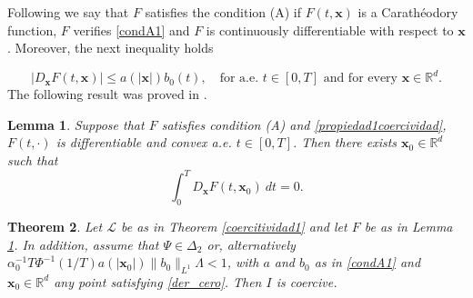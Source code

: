 \documentclass[twoside]{article}
\newtheorem{thm}{Theorem}[section]
\newtheorem{lem}[thm]{Lemma}
\theoremstyle{remark}
\renewcommand{\b}[1]{\boldsymbol{#1}}
\newcommand{\rr}{\mathbb{R}}
\renewcommand{\leq}{\leqslant}
\begin{document}
Following \cite{mawhin2010critical} we say that $F$ satisfies the condition (A) if  $F(t,\b{x})$ is a Carath\'eodory function, $F$ verifies \eqref{condA1} and $F$ is continuously differentiable with respect to $\b{x}$. Moreover, the next inequality holds 

\begin{equation}\label{condA2} |D_{\b{x}}F(t,\b{x})|\leq a(|\b{x}|)b_0(t),\quad\text{for a.e. }t\in [0,T] \text{ and for every }\b{x}\in\rr^d.
\end{equation}
The following result was proved in \cite[p. 18]{mawhin2010critical}. 
\begin{lem}\label{lema_pto_cri} Suppose that $F$ satisfies condition (A) and \eqref{propiedad1coercividad}, $F(t,\cdot)$ is  differentiable and convex  a.e. $t\in [0,T]$. Then there exists $\b{x}_0\in\rr^d$ such that
\begin{equation}\label{der_cero}
 \int_0^T D_{\b{x}} F(t,\b{x}_0)\ dt=0.
\end{equation}
\end{lem}


\begin{thm}\label{segcoerthm}
Let $\mathcal{L}$ be as in Theorem \ref{coercitividad1} and let $F$ be as in Lemma \ref{lema_pto_cri}. In addition, assume that $\Psi\in\Delta_2$ or, alternatively  $\alpha_0^{-1}T\Phi^{-1}\left(1/T\right)a(|\b{x}_0|)\|b_0\|_{L^1} \Lambda<1$, with $a$ and $b_0$ as in \eqref{condA1} and $\b{x}_0\in\rr^d$  any point satisfying  \eqref{der_cero}. Then $I$ is coercive. 

\end{thm}
\end{document}
